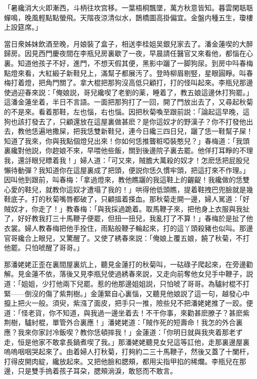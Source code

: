 \begin{myquote}
「暑纔消大火即漸西，斗柄往坎宫移。一葉梧桐飄墜，萬方秋意皆知。暮雲閑聒聒蟬鳴，晚風輕點點螢飛。天階夜涼清似水，鵲橋圖高掛偏宜。金盤内種五生，瓊樓上設筵席。」
\end{myquote}

當日衆姊妹飲酒至晚，月娘裝了盒子，相送李桂姐吴銀兒家去了。潘金蓮喫的大醉歸房。因見西門慶夜間在李瓶兒房裏歇了一夜，早晨請任醫官又來看他，都惱在心裏。知道他孩子不好，進門，不想天假其便，黑影中躧了一脚狗尿。到房中呌春梅點燈來看，大紅緞子新鞋兒上，滿幫子都展汚了。登時柳眉剔竪，星眼圓睜。叫春梅打着燈，把角門關了。拿大棍把那狗沒高低只顧打，打的怪叫起來。李瓶兒那邊使過迎春來説：「俺娘説，哥兒纔喫了老劉的薬，睡着了，教五娘這邊休打狗罷。」這潘金蓮坐着，半日不言語。一面把那狗打了一回，開了門放出去了，又尋起秋菊的不是來。看着那鞋，左也惱，右也惱。因把秋菊喚至跟前説：「論起這早晚，這狗也該打發去了，只顧還放在這屋裏做甚麽？是你這奴才的野漢子？你不打發他出去，教他恁遍地撒屎，把我恁雙新鞋兒，連今日纔三四日兒，躧了恁一鞋幫子屎！知道了我來，你與我點個燈兒出來！你如何恁推聾粧啞裝憨兒？」春梅道：「我頭裏纔對他説，你趂娘不來，早喂他些飯，關到後邊院子裏去罷。他佯打耳睜的不理我，還㧱眼兒瞟着我！」婦人道：「可又來，賊膽大萬殺的奴才！怎麽恁把屁股兒懶待動彈？我知道你在這屋裏成了把頭，便説你恁久慣牢頭，把這打來不作理。」因叫他到跟前，叫春梅：「拿過燈來，教他瞧躧的我這鞋上的齷齪！我纔做的恁雙心愛的鞋兒，就教你這奴才遭塌了我的！」哄得他低頭瞧，提着鞋拽巴兜臉就是幾鞋底子。打的秋菊嘴唇都破了，只顧搵着搽血。那秋菊走開一邊，婦人駡道：「好賊奴才，你走了！」教春梅：「與我採過跪着。取馬鞭子來，把他身上衣服與我扯了，好好教我打三十馬鞭子便罷，但扭一扭兒，我亂打了不算！」春梅於是扯了他衣裳。婦人教春梅把他手拴住，雨點般鞭子輪起來，打的這丫頭殺豬也似叫。那邊官哥纔合上眼兒，又驚醒了。又使了綉春來説：「俺娘上覆五娘，饒了秋菊，不打他罷。只怕唬醒了哥哥。」

那潘姥姥正歪在裏間屋裏炕上，聽見金蓮打的秋菊叫，一𥑮碌子爬起來，在旁邊勸解。見金蓮不依，落後又見李瓶兒使過綉春來説，又走向前奪他女兒手中鞭子，説道：「姐姐，少打他兩下兒罷。惹的他那邊姐姐説，只怕唬了哥哥。為驢紂棍不打緊——倒沒的傷了紫荆樹。」金蓮緊自心裏惱，又聽見他娘説了這一句，越發心中攛上把火一般。須臾，紫漒了面皮，把手只一推，險些兒不把潘姥姥推了一跤。便道：「怪老貨，你不知道，與我過一邊坐着去！不干你事，來勸甚麽膫子？甚麽紫荆樹，驢紂棍，單管外合裏應！」潘姥姥道：「賊作死的短壽命！我怎的外合裏應？我來你家討冷飯喫？教你恁頓摔我！」金蓮道：「你明日就與我夾着那老ず走，恒是他家不敢拿長鍋煮喫了我。」那潘姥姥聽見女兒這等訌他，走那裏邊屋裏嗚嗚咽咽哭起來了。由着婦人打秋菊，打夠約二三十馬鞭子，然後又蓋了十闌杆，打得皮開肉綻，纔放起來。又把他臉和腮頰，都用尖指甲掐的稀爛。李瓶兒在那邊，只是雙手摀着孩子耳朶，腮頰淌淚，敢怒而不敢言。

